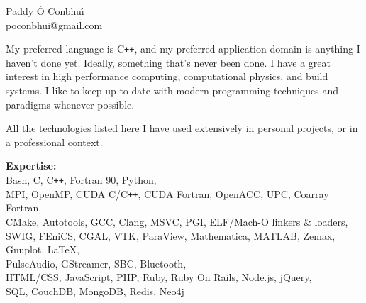 \documentclass[11pt]{article}
\newcommand{\resumeSection}[1]{
    \par
    \large {\sc {#1}}
    \par
    \vspace{-0.9\baselineskip}
    \hrulefill
    \vspace{0.25\baselineskip}
    \par
}
\newenvironment{resumeSubSectionBody}{
    \par
    \vspace{-0.2\parskip}
    \begin{small}
    \par
} {
    \par
    \end{small}
    \par
}
\newenvironment{resumeDescription}{
    \vspace{-0.5\baselineskip}
    \begin{description}
} {
    \end{description}
}
\begin{document}


%
%
\begin{center}
    { \huge \textbf \sc Paddy \'O Conbhu\'\i } \\
    poconbhui@gmail.com
\end{center}




\resumeSection{Software Development}


%
%
\begin{resumeSubSectionBody}

    My preferred language is C\verb!++!, and my preferred application domain is
    anything I haven't done yet.
    Ideally, something that's never been done.
    I have a great interest in high performance computing, computational
    physics, and build systems.
    I like to keep up to date with modern programming techniques and paradigms
    whenever possible.

    All the technologies listed here I have used extensively in personal
    projects, or in a professional context.

    \begin{resumeDescription}
        \item{\bf Expertise:} \\
            Bash, C, C\verb!++!, Fortran 90, Python,
            \\
            MPI, OpenMP, CUDA C/C\verb!++!, CUDA Fortran,
            OpenACC, UPC, Coarray Fortran,
            \\
            CMake, Autotools, GCC, Clang, MSVC, PGI, ELF/Mach-O linkers \& loaders,
            \\
            SWIG, FEniCS, CGAL, VTK, ParaView,
            Mathematica, MATLAB, Zemax, Gnuplot, LaTeX,
            \\
            PulseAudio, GStreamer, SBC, Bluetooth,
            \\
            HTML/CSS, JavaScript, PHP, Ruby,
            Ruby On Rails, Node.js, jQuery,
            \\
            SQL, CouchDB, MongoDB, Redis, Neo4j
    \end{resumeDescription}

\end{resumeSubSectionBody}
\end{document}
